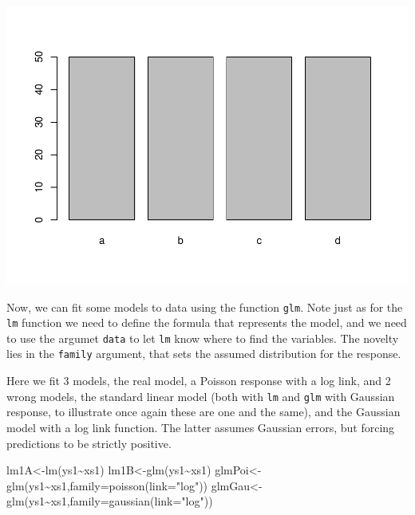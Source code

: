 \documentclass[
]{book}
\newenvironment{Shaded}{\begin{snugshade}}{\end{snugshade}}
\newcommand{\AttributeTok}[1]{\textcolor[rgb]{0.77,0.63,0.00}{#1}}
\newcommand{\FunctionTok}[1]{\textcolor[rgb]{0.00,0.00,0.00}{#1}}
\newcommand{\NormalTok}[1]{#1}
\newcommand{\OtherTok}[1]{\textcolor[rgb]{0.56,0.35,0.01}{#1}}
\newcommand{\SpecialCharTok}[1]{\textcolor[rgb]{0.00,0.00,0.00}{#1}}
\newcommand{\StringTok}[1]{\textcolor[rgb]{0.31,0.60,0.02}{#1}}
\begin{document}
\includegraphics{ECOMODbook_files/figure-latex/unnamed-chunk-2-1.pdf}

Now, we can fit some models to data using the function \texttt{glm}. Note just as for the \texttt{lm} function we need to define the formula that represents the model, and we need to use the argumet \texttt{data} to let \texttt{lm} know where to find the variables. The novelty lies in the \texttt{family} argument, that sets the assumed distribution for the response.

Here we fit 3 models, the real model, a Poisson response with a log link, and 2 wrong models, the standard linear model (both with \texttt{lm} and \texttt{glm} with Gaussian response, to illustrate once again these are one and the same), and the Gaussian model with a log link function. The latter assumes Gaussian errors, but forcing predictions to be strictly positive.

\begin{Shaded}
\begin{Highlighting}[]
\NormalTok{lm1A}\OtherTok{\textless{}{-}}\FunctionTok{lm}\NormalTok{(ys1}\SpecialCharTok{\textasciitilde{}}\NormalTok{xs1)}
\NormalTok{lm1B}\OtherTok{\textless{}{-}}\FunctionTok{glm}\NormalTok{(ys1}\SpecialCharTok{\textasciitilde{}}\NormalTok{xs1)}
\NormalTok{glmPoi}\OtherTok{\textless{}{-}}\FunctionTok{glm}\NormalTok{(ys1}\SpecialCharTok{\textasciitilde{}}\NormalTok{xs1,}\AttributeTok{family=}\FunctionTok{poisson}\NormalTok{(}\AttributeTok{link=}\StringTok{"log"}\NormalTok{))}
\NormalTok{glmGau}\OtherTok{\textless{}{-}}\FunctionTok{glm}\NormalTok{(ys1}\SpecialCharTok{\textasciitilde{}}\NormalTok{xs1,}\AttributeTok{family=}\FunctionTok{gaussian}\NormalTok{(}\AttributeTok{link=}\StringTok{"log"}\NormalTok{))}
\end{Highlighting}
\end{Shaded}
\end{document}
